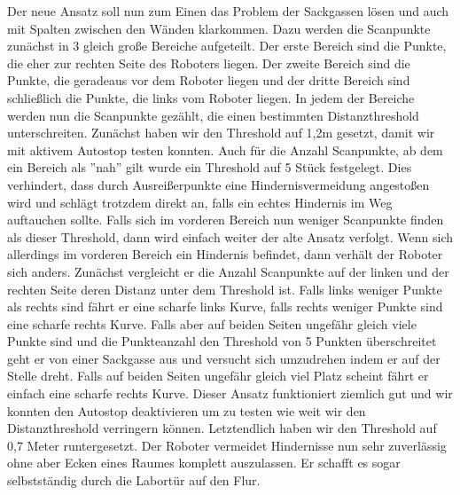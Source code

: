 Der neue Ansatz soll nun zum Einen das Problem der Sackgassen lösen und auch mit Spalten zwischen den Wänden klarkommen. Dazu werden die Scanpunkte zunächst in 3 gleich große Bereiche aufgeteilt. Der erste Bereich sind die Punkte, die eher zur rechten Seite des Roboters liegen. Der zweite Bereich sind die Punkte, die geradeaus vor dem Roboter liegen und der dritte Bereich sind schließlich die Punkte, die links vom Roboter liegen. In jedem der Bereiche werden nun die Scanpunkte gezählt, die einen bestimmten Distanzthreshold unterschreiten. Zunächst haben wir den Threshold auf 1,2m gesetzt, damit wir mit aktivem Autostop testen konnten.
Auch für die Anzahl Scanpunkte, ab dem ein Bereich als ''nah'' gilt wurde ein Threshold auf 5 Stück festgelegt. Dies verhindert, dass durch Ausreißerpunkte eine Hindernisvermeidung angestoßen wird und schlägt trotzdem direkt an, falls ein echtes Hindernis im Weg auftauchen sollte.
Falls sich im vorderen Bereich nun weniger Scanpunkte finden als dieser Threshold, dann wird einfach weiter der alte Ansatz verfolgt. Wenn sich allerdings im vorderen Bereich ein Hindernis befindet, dann verhält der Roboter sich anders. Zunächst vergleicht er die Anzahl Scanpunkte auf der linken und der rechten Seite deren Distanz unter dem Threshold ist. Falls links weniger Punkte als rechts sind fährt er eine scharfe links Kurve, falls rechts weniger Punkte sind eine scharfe rechts Kurve. Falls aber auf beiden Seiten ungefähr gleich viele Punkte sind und die Punkteanzahl den Threshold von 5 Punkten überschreitet geht er von einer Sackgasse aus und versucht sich umzudrehen indem er auf der Stelle dreht. Falls auf beiden Seiten ungefähr gleich viel Platz scheint fährt er einfach eine scharfe rechts Kurve.
Dieser Ansatz funktioniert ziemlich gut und wir konnten den Autostop deaktivieren um zu testen wie weit wir den Distanzthreshold verringern können. Letztendlich haben wir den Threshold auf 0,7 Meter runtergesetzt. Der Roboter vermeidet Hindernisse nun sehr zuverlässig ohne aber Ecken eines Raumes komplett auszulassen. Er schafft es sogar selbstständig durch die Labortür auf den Flur.